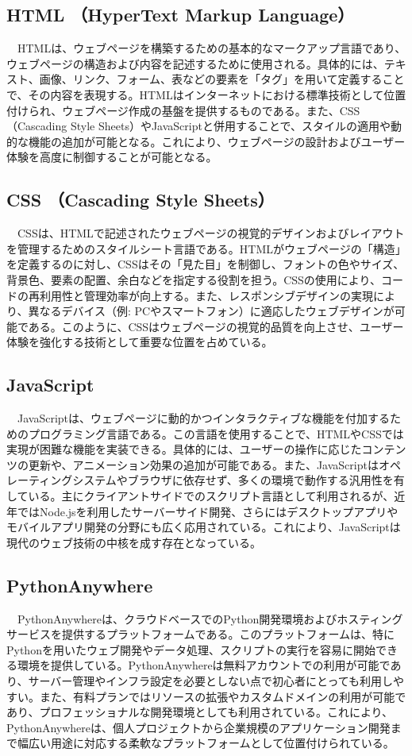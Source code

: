 \subsection{HTML （HyperText Markup Language）}
　HTMLは、ウェブページを構築するための基本的なマークアップ言語であり、ウェブページの構造および内容を記述するために使用される。具体的には、テキスト、画像、リンク、フォーム、表などの要素を「タグ」を用いて定義することで、その内容を表現する。HTMLはインターネットにおける標準技術として位置付けられ、ウェブページ作成の基盤を提供するものである。また、CSS（Cascading Style Sheets）やJavaScriptと併用することで、スタイルの適用や動的な機能の追加が可能となる。これにより、ウェブページの設計およびユーザー体験を高度に制御することが可能となる。
\subsection{CSS （Cascading Style Sheets）}
　CSSは、HTMLで記述されたウェブページの視覚的デザインおよびレイアウトを管理するためのスタイルシート言語である。HTMLがウェブページの「構造」を定義するのに対し、CSSはその「見た目」を制御し、フォントの色やサイズ、背景色、要素の配置、余白などを指定する役割を担う。CSSの使用により、コードの再利用性と管理効率が向上する。また、レスポンシブデザインの実現により、異なるデバイス（例: PCやスマートフォン）に適応したウェブデザインが可能である。このように、CSSはウェブページの視覚的品質を向上させ、ユーザー体験を強化する技術として重要な位置を占めている。
\subsection{JavaScript}
　JavaScriptは、ウェブページに動的かつインタラクティブな機能を付加するためのプログラミング言語である。この言語を使用することで、HTMLやCSSでは実現が困難な機能を実装できる。具体的には、ユーザーの操作に応じたコンテンツの更新や、アニメーション効果の追加が可能である。また、JavaScriptはオペレーティングシステムやブラウザに依存せず、多くの環境で動作する汎用性を有している。主にクライアントサイドでのスクリプト言語として利用されるが、近年ではNode.jsを利用したサーバーサイド開発、さらにはデスクトップアプリやモバイルアプリ開発の分野にも広く応用されている。これにより、JavaScriptは現代のウェブ技術の中核を成す存在となっている。
\subsection{PythonAnywhere}
　PythonAnywhereは、クラウドベースでのPython開発環境およびホスティングサービスを提供するプラットフォームである。このプラットフォームは、特にPythonを用いたウェブ開発やデータ処理、スクリプトの実行を容易に開始できる環境を提供している。PythonAnywhereは無料アカウントでの利用が可能であり、サーバー管理やインフラ設定を必要としない点で初心者にとっても利用しやすい。また、有料プランではリソースの拡張やカスタムドメインの利用が可能であり、プロフェッショナルな開発環境としても利用されている。これにより、PythonAnywhereは、個人プロジェクトから企業規模のアプリケーション開発まで幅広い用途に対応する柔軟なプラットフォームとして位置付けられている。

